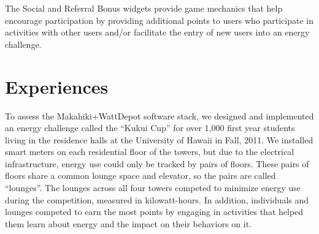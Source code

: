\documentclass{acm_proc_article-sp}
\begin{document}
The Social and Referral Bonus widgets provide game mechanics that help encourage
participation by providing additional points to users who participate in activities with
other users and/or facilitate the entry of new users into an energy challenge. 

\section{Experiences}

To assess the Makahiki+WattDepot software stack, we designed and implemented an energy
challenge called the ``Ku\-kui Cup'' for over 1,000 first year students living in the
residence halls at the University of Hawaii in Fall, 2011.  We installed smart meters on each
residential floor of the towers, but due to the electrical infrastructure, energy use could
only be tracked by pairs of floors. These pairs of floors share a common lounge space and
elevator, so the pairs are called ``lounges''. The lounges across all four towers competed
to minimize energy use during the competition, measured in kilowatt-hours. In addition,
individuals and lounges competed to earn the most points by engaging in activities that
helped them learn about energy and the impact on their behaviors on it.

















 
\end{document}
